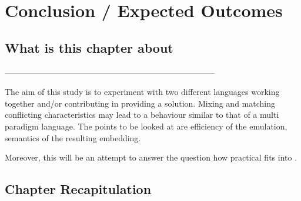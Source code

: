 \documentclass[thesis-solanki.tex]{subfiles}
\begin{document}
\chapter{Conclusion / Expected Outcomes}\label{chap:conclusion}


\section{What is this chapter about}

-----------------------------------------------------------------------------


\begin{comment}
As we have seen there have been a number of attempts at solving the problem and so have been the issues. First and foremost, with appropriate  documentation the resulting library should be easy to use. Writing a program must be very much the same as writing a program in the host language. With the introduction of few new constructs defining
\end{comment}

The aim of this study is to experiment with two different languages working together and/or contributing in providing a solution. Mixing and matching conflicting characteristics may lead to a behaviour similar to that of a multi paradigm language. The points to be looked at are efficiency of the emulation, semantics of the resulting embedding.

Moreover, this will be an attempt to answer the question how practical  fits into .                  


\section{Chapter Recapitulation}
\end{document}
